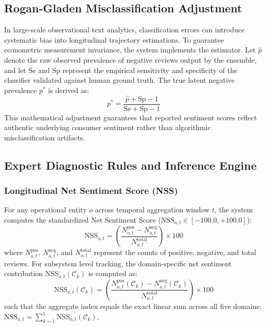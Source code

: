\documentclass[review,12pt,authoryear]{elsarticle}
\begin{document}
\subsection{Rogan-Gladen Misclassification Adjustment}
In large-scale observational text analytics, classification errors can introduce systematic bias into longitudinal trajectory estimations. To guarantee econometric measurement invariance, the system implements the \citet{rogan1978estimating} estimator. Let $\hat{p}$ denote the raw observed prevalence of negative reviews output by the ensemble, and let $\mathrm{Se}$ and $\mathrm{Sp}$ represent the empirical sensitivity and specificity of the classifier validated against human ground truth. The true latent negative prevalence $p^*$ is derived as:
\begin{equation}
p^* = \frac{\hat{p} + \mathrm{Sp} - 1}{\mathrm{Se} + \mathrm{Sp} - 1}
\end{equation}
This mathematical adjustment guarantees that reported sentiment scores reflect authentic underlying consumer sentiment rather than algorithmic misclassification artifacts.

\subsection{Expert Diagnostic Rules and Inference Engine}

\subsubsection{Longitudinal Net Sentiment Score (NSS)}
For any operational entity $o$ across temporal aggregation window $t$, the system computes the standardized Net Sentiment Score ($\text{NSS}_{o,t} \in [-100.0, +100.0]$):
\begin{equation}
\text{NSS}_{o,t} = \left( \frac{N_{o,t}^{\text{pos}} - N_{o,t}^{\text{neg}}}{N_{o,t}^{\text{total}}} \right) \times 100
\end{equation}
where $N_{o,t}^{\text{pos}}$, $N_{o,t}^{\text{neg}}$, and $N_{o,t}^{\text{total}}$ represent the counts of positive, negative, and total reviews. For subsystem level tracking, the domain-specific net sentiment contribution $\text{NSS}_{o,t}(\mathcal{C}_k)$ is computed as:
\begin{equation}
\text{NSS}_{o,t}(\mathcal{C}_k) = \left( \frac{N_{o,t}^{\text{pos}}(\mathcal{C}_k) - N_{o,t}^{\text{neg}}(\mathcal{C}_k)}{N_{o,t}^{\text{total}}} \right) \times 100
\end{equation}
such that the aggregate index equals the exact linear sum across all five domains: $\text{NSS}_{o,t} = \sum_{k=1}^5 \text{NSS}_{o,t}(\mathcal{C}_k)$.
\end{document}

